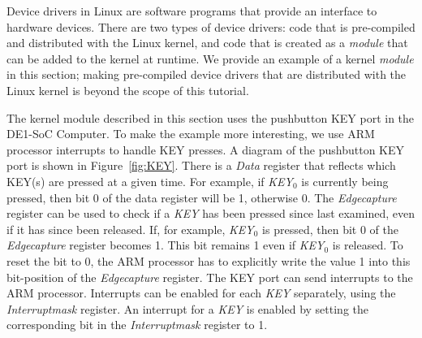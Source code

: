 \documentclass[11pt, twoside, pdftex]{article}
\begin{document}
Device drivers in Linux are software programs that provide an interface to hardware devices. 
There are two types of device drivers: code that is pre-compiled and distributed with
the Linux kernel, and code that is created as a {\it module} that can be added to the kernel at
runtime. We provide an example of a kernel {\it module} in this section; making pre-compiled device 
drivers that are distributed with the Linux kernel is beyond the scope of this tutorial. 

The kernel module described in this section uses the pushbutton KEY port in the DE1-SoC 
Computer. To make the example more interesting, we use ARM processor interrupts to handle
KEY presses. A diagram of the pushbutton KEY port is shown in
Figure~\ref{fig:KEY}. There is a {\it Data} register that reflects which KEY(s) are pressed at
a given time. For example, if {\it KEY}$_0$ is currently being pressed, then bit 0 of the data 
register will be 1, otherwise 0. The {\it Edgecapture} register can be used to check if a 
{\it KEY} has been pressed since last examined, even if it has since been released. If, for 
example, {\it KEY}$_0$ is pressed, then bit 0 of the {\it Edgecapture} register becomes 1. 
This bit remains 1 even if {\it KEY}$_0$ is released. To reset the bit to 0, the ARM processor 
has to explicitly write the value 1 into this bit-position of the {\it Edgecapture} register. The
KEY port can send interrupts to the ARM processor. Interrupts can be enabled for each {\it KEY}
separately, using the {\it Interruptmask} register. An interrupt for a {\it KEY} is enabled 
by setting the corresponding bit in the {\it Interruptmask} register to 1.
\end{document}
